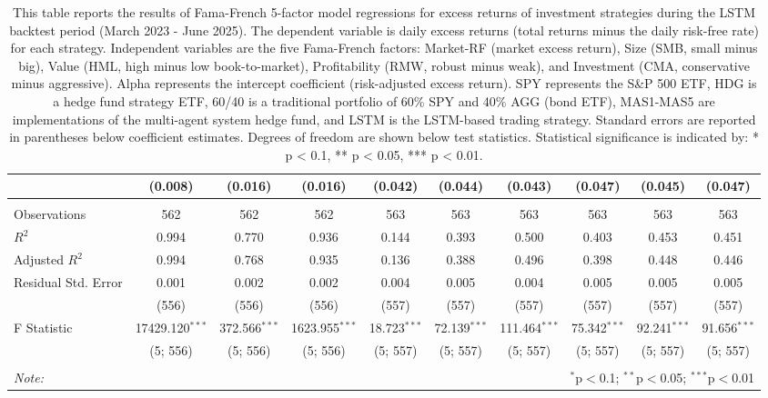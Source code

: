 \begin{table}[!htbp]
\begin{tabular}{@{\extracolsep{5pt}}lccccccccc}
& (0.008) & (0.016) & (0.016) & (0.042) & (0.044) & (0.043) & (0.047) & (0.045) & (0.047) \\
\hline \\[-1.8ex]
 Observations & 562 & 562 & 562 & 563 & 563 & 563 & 563 & 563 & 563 \\
 $R^2$ & 0.994 & 0.770 & 0.936 & 0.144 & 0.393 & 0.500 & 0.403 & 0.453 & 0.451 \\
 Adjusted $R^2$ & 0.994 & 0.768 & 0.935 & 0.136 & 0.388 & 0.496 & 0.398 & 0.448 & 0.446 \\
 Residual Std. Error & 0.001 & 0.002 & 0.002 & 0.004 & 0.005 & 0.004 & 0.005 & 0.005 & 0.005 \\
 & (556) & (556) & (556) & (557) & (557) & (557) & (557) & (557) & (557) \\
 F Statistic & 17429.120$^{***}$ & 372.566$^{***}$ & 1623.955$^{***}$ & 18.723$^{***}$ & 72.139$^{***}$ & 111.464$^{***}$ & 75.342$^{***}$ & 92.241$^{***}$ & 91.656$^{***}$ \\
 & (5; 556) & (5; 556) & (5; 556) & (5; 557) & (5; 557) & (5; 557) & (5; 557) & (5; 557) & (5; 557) \\
\hline
\hline \\[-1.8ex]
\textit{Note:} & \multicolumn{9}{r}{$^{*}$p$<$0.1; $^{**}$p$<$0.05; $^{***}$p$<$0.01} \\
\end{tabular}
\caption[Fama-French 5-Factor Model Results (LSTM Period)]{This table reports the results of Fama-French 5-factor model regressions for excess returns of investment strategies during the LSTM backtest period (March 2023 - June 2025). The dependent variable is daily excess returns (total returns minus the daily risk-free rate) for each strategy. Independent variables are the five Fama-French factors: Market-RF (market excess return), Size (SMB, small minus big), Value (HML, high minus low book-to-market), Profitability (RMW, robust minus weak), and Investment (CMA, conservative minus aggressive). Alpha represents the intercept coefficient (risk-adjusted excess return). SPY represents the S\&P 500 ETF, HDG is a hedge fund strategy ETF, 60/40 is a traditional portfolio of 60\% SPY and 40\% AGG (bond ETF), MAS1-MAS5 are implementations of the multi-agent system hedge fund, and LSTM is the LSTM-based trading strategy. Standard errors are reported in parentheses below coefficient estimates. Degrees of freedom are shown below test statistics. Statistical significance is indicated by: * p < 0.1, ** p < 0.05, *** p < 0.01.}
\label{tab:fama_french_5factor_lstm_aligned}
\end{table}
